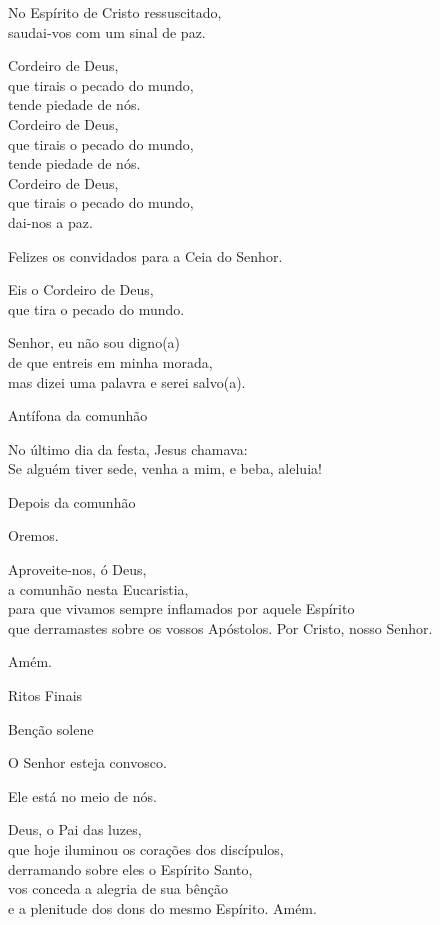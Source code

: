\documentclass{book}
\begin{document}
\begin{flushleft}
    No Espírito de Cristo ressuscitado, \\
    saudai-vos com um sinal de paz.

    Cordeiro de Deus, \\
    que tirais o pecado do mundo, \\
    tende piedade de nós. \\
    Cordeiro de Deus, \\
    que tirais o pecado do mundo, \\
    tende piedade de nós. \\
    Cordeiro de Deus, \\
    que tirais o pecado do mundo, \\
    dai-nos a paz.

    Felizes os convidados para a Ceia do Senhor.

    Eis o Cordeiro de Deus, \\
    que tira o pecado do mundo.

    Senhor, eu não sou digno(a) \\
    de que entreis em minha morada, \\
    mas dizei uma palavra e serei salvo(a).

    Antífona da comunhão

    No último dia da festa, Jesus chamava: \\
    Se alguém tiver sede, venha a mim, e beba, aleluia!

    Depois da comunhão

    Oremos.

    Aproveite-nos, ó Deus, \\
    a comunhão nesta Eucaristia, \\
    para que vivamos sempre inflamados por aquele Espírito \\
    que derramastes sobre os vossos Apóstolos.
    Por Cristo, nosso Senhor.

    Amém.

    Ritos Finais

    Benção solene

    O Senhor esteja convosco.

    Ele está no meio de nós.

    Deus, o Pai das luzes, \\
    que hoje iluminou os corações dos discípulos, \\
    derramando sobre eles o Espírito Santo, \\
    vos conceda a alegria de sua bênção \\
    e a plenitude dos dons do mesmo Espírito.
    Amém.


\end{flushleft}
\end{document}
